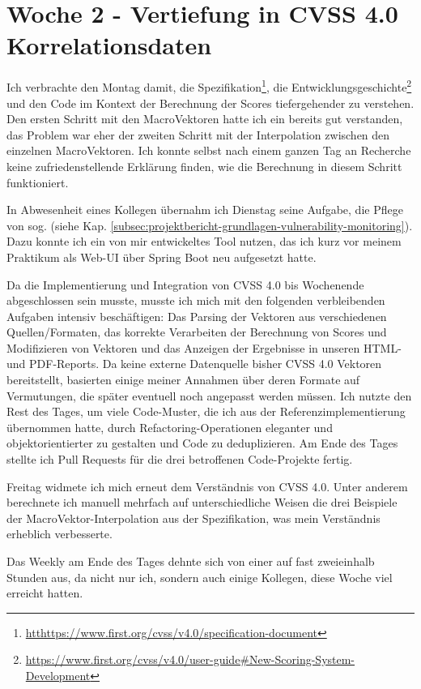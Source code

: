 \section{Woche 2 - Vertiefung in CVSS 4.0 \headerand Korrelationsdaten} \label{sec:bericht-wo-2}


\lweekdaymarginpar{\weekdayMondayLong}

Ich verbrachte den Montag damit, die Spezifikation\footnote{\url{htthttps://www.first.org/cvss/v4.0/specification-document}},
die Entwicklungsgeschichte\footnote{\url{https://www.first.org/cvss/v4.0/user-guide\#New-Scoring-System-Development}}
und den Code im Kontext der Berechnung der Scores tiefergehender zu verstehen.
Den ersten Schritt mit den MacroVektoren hatte ich ein bereits gut verstanden, das Problem war eher der zweiten Schritt mit der Interpolation zwischen den einzelnen MacroVektoren.
Ich konnte selbst nach einem ganzen Tag an Recherche keine zufriedenstellende Erklärung finden, wie die Berechnung in diesem Schritt funktioniert.

\sweekdaymarginpar{\weekdayTuesdayShort, \weekdayWednesdayShort}

In Abwesenheit eines Kollegen übernahm ich Dienstag seine Aufgabe, die Pflege von sog.  (siehe Kap. \ref{subsec:projektbericht-grundlagen-vulnerability-monitoring}).
Dazu konnte ich ein von mir entwickeltes Tool nutzen, das ich kurz vor meinem Praktikum als Web-UI über Spring Boot neu aufgesetzt hatte.

\sweekdaymarginpar{\weekdayThursdayLong}

Da die Implementierung und Integration von CVSS 4.0 bis Wochenende abgeschlossen sein musste, musste ich mich mit den folgenden verbleibenden Aufgaben intensiv beschäftigen:
Das Parsing der Vektoren aus verschiedenen Quellen/Formaten, das korrekte Verarbeiten der Berechnung von Scores und Modifizieren von Vektoren und das Anzeigen der Ergebnisse in unseren HTML- und PDF-Reports.
Da keine externe Datenquelle bisher CVSS 4.0 Vektoren bereitstellt, basierten einige meiner Annahmen über deren Formate auf Vermutungen, die später eventuell noch angepasst werden müssen.
Ich nutzte den Rest des Tages, um viele Code-Muster, die ich aus der Referenzimplementierung übernommen hatte, durch Refactoring-Operationen eleganter und objektorientierter zu gestalten und Code zu deduplizieren.
Am Ende des Tages stellte ich Pull Requests für die drei betroffenen Code-Projekte fertig.

\sweekdaymarginpar{\weekdayFridayLong}

Freitag widmete ich mich erneut dem Verständnis von CVSS 4.0.
Unter anderem berechnete ich manuell mehrfach auf unterschiedliche Weisen die drei Beispiele der MacroVektor-Interpolation aus der Spezifikation, was mein Verständnis erheblich verbesserte.

Das Weekly am Ende des Tages dehnte sich von einer auf fast zweieinhalb Stunden aus, da nicht nur ich, sondern auch einige Kollegen, diese Woche viel erreicht hatten.
